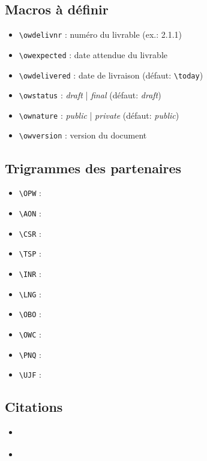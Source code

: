 \documentclass[a4paper,11pt,twoside]{report}
\begin{document}
\subsection{Macros à définir}

\begin{itemize}
\item \verb+\owdelivnr+ : numéro du livrable (ex.: 2.1.1)
\item \verb+\owexpected+ : date attendue du livrable
\item \verb+\owdelivered+ : date de livraison (défaut: \verb+\today+)
\item \verb+\owstatus+ : \textit{draft} | \textit{final} (défaut: \textit{draft})
\item \verb+\ownature+ : \textit{public} | \textit{private} (défaut: \textit{public})
\item \verb+\owversion+ : version du document
\end{itemize}

\subsection{Trigrammes des partenaires}

\begin{itemize}
\item \verb+\OPW+ : \OPW
\item \verb+\AON+ : \AON
\item \verb+\CSR+ : \CSR
\item \verb+\TSP+ : \TSP
\item \verb+\INR+ : \INR
\item \verb+\LNG+ : \LNG
\item \verb+\OBO+ : \OBO
\item \verb+\OWC+ : \OWC
\item \verb+\PNQ+ : \PNQ
\item \verb+\UJF+ : \UJF
\end{itemize}

\subsection{Citations}

\begin{itemize}
\item \cite{occi-core-12}
\item \cite{occi-http-rendering}
\end{itemize}





\end{document}
